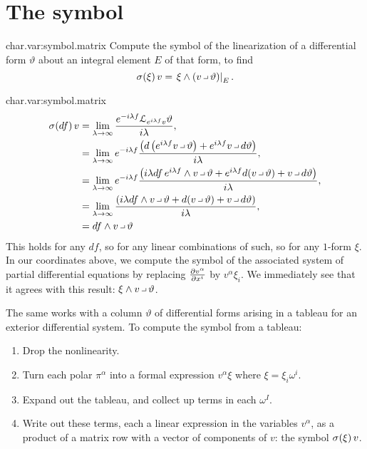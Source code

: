 \section{The symbol}
\begin{problem}{char.var:symbol.matrix}
Compute the symbol of the linearization of a differential form \(\vartheta\) about an integral element \(E\) of that form, to find
\[
\opsymbol[]{\xi}v=\left.\xi\wedge(v\hook\vartheta)\right|_E.
\]
\end{problem}
\begin{answer}{char.var:symbol.matrix}
\begin{align*}
\opsymbol[]{df}v
&=
\lim_{\lambda\to\infty}
\frac{e^{-i\lambda f} \LieDer_{e^{i\lambda f}v}\vartheta}{i\lambda},
\\
&=
\lim_{\lambda\to\infty}
e^{-i\lambda f}
\frac{\left(d\left(e^{i\lambda f}v\hook\vartheta\right)+e^{i\lambda f}v\hook d\vartheta\right)}{i\lambda},
\\
&=
\lim_{\lambda\to\infty}
e^{-i\lambda f}
\frac{\left(i\lambda df\, e^{i\lambda f}\wedge v\hook\vartheta
+
e^{i\lambda f}d(v\hook\vartheta)+v\hook d\vartheta\right)}{i\lambda},
\\
&=
\lim_{\lambda\to\infty}\frac{\left(i\lambda df\wedge v\hook\vartheta
+
d(v\hook\vartheta)+v\hook d\vartheta\right)}{i\lambda},
\\
&=
df\wedge v\hook\vartheta
\end{align*}
This holds for any \(df\), so for any linear combinations of such, so for any \(1\)-form \(\xi\).
In our coordinates above, we compute the symbol of the associated system of partial differential equations by replacing \(\pderiv{v^{\alpha}}{x^i}\) by \(v^{\alpha}\xi_i\).
We immediately see that it agrees with this result: \(\xi\wedge v\hook\vartheta\).
\end{answer}
The same works with a column \(\vartheta\) of differential forms arising in a tableau for an exterior differential system.
To compute the symbol from a tableau:
\begin{enumerate}
\item
Drop the nonlinearity.
\item
Turn each polar \(\pi^{\alpha}\) into a formal expression \(v^{\alpha}\xi\) where \(\xi=\xi_i\omega^i\).
\item
Expand out the tableau, and collect up terms in each \(\omega^I\).
\item
Write out these terms, each a linear expression in the variables \(v^{\alpha}\), as a product of a matrix row with a vector of components of \(v\): the symbol \(\opsymbol[]{\xi}v\).
\end{enumerate}
